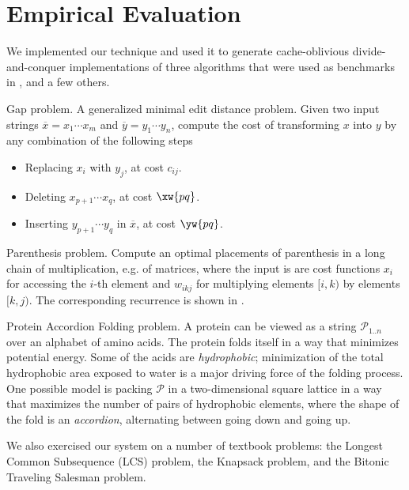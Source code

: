 \section{Empirical Evaluation}

We implemented our technique and used it to generate cache-oblivious
divide-and-conquer implementations of three algorithms that were used as
benchmarks in \cite{IPDPS15/Tithi}, and a few others.

\begin{paragraph}{Gap problem.}
A generalized minimal edit distance problem. Given two input strings 
$\overline{x}=x_1\cdots x_m$ and $\overline{y}=y_1\cdots y_n$,
compute the cost of transforming $x$ into $y$ by any combination of the
following steps
\begin{itemize}
  \item Replacing $x_i$ with $y_j$, at cost $c_{ij}$.
  \item Deleting $x_{p+1}\cdots x_q$, at cost $\xw{pq}$.
  \item Inserting $y_{p+1}\cdots y_q$ in $\overline{x}$, at cost $\yw{pq}$.
\end{itemize}
\end{paragraph}

\begin{paragraph}{Parenthesis problem.} Compute
an optimal placements of parenthesis in a long chain of multiplication, e.g. of matrices, where the input is
are cost functions $x_i$ for accessing the $i$-th element and
$w_{ikj}$ for multiplying elements $[i,k)$ by elements $[k,j)$.
The corresponding recurrence is shown in .
\end{paragraph}

\begin{paragraph}{Protein Accordion Folding problem.} A protein can be viewed
as a string $\mathcal{P}_{1..n}$ over an alphabet of amino acids. 
The protein folds itself in a way that minimizes potential energy.
Some of the acids are {\em hydrophobic}; minimization of the total hydrophobic
area exposed to water is a major driving force of the folding process.
One possible model is packing $\mathcal{P}$ in a two-dimensional square lattice
in a way that maximizes the number of pairs of hydrophobic elements,
where the shape of the fold is an {\em accordion}, alternating between going down and going
up.
\end{paragraph}

\medskip
We also exercised our system on a number of textbook problems:
the Longest Common Subsequence (LCS) problem, the Knapsack problem,
and the Bitonic Traveling Salesman problem.

